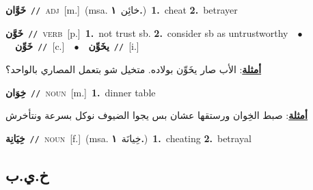 \documentclass[10pt,a4paper,twoside]{article} %
\begin{document}
\begin{multicols}{2}
{\setlength\topsep{0pt}\textbf{\foreignlanguage{arabic}{خَوَّان}}\ {\color{gray}\texttt{//}\color{black}}\ \textsc{adj}\ [m.]\ \color{gray}(msa. \foreignlanguage{arabic}{خائِن}~\foreignlanguage{arabic}{\textbf{١.}})\color{black}\ \textbf{1.}~cheat  \textbf{2.}~betrayer\ } \vspace{2mm}

{\setlength\topsep{0pt}\textbf{\foreignlanguage{arabic}{خَوَّن}}\ {\color{gray}\texttt{//}\color{black}}\ \textsc{verb}\ [p.]\ \textbf{1.}~not trust sb.  \textbf{2.}~consider sb as untrustworthy\ \ $\bullet$\ \ \setlength\topsep{0pt}\textbf{\foreignlanguage{arabic}{خَوِّن}}\ {\color{gray}\texttt{//}\color{black}}\ [c.]\ \ $\bullet$\ \ \setlength\topsep{0pt}\textbf{\foreignlanguage{arabic}{يخَوِّن}}\ {\color{gray}\texttt{//}\color{black}}\ [i.]\  \begin{flushright}\color{gray}\foreignlanguage{arabic}{\textbf{\underline{\foreignlanguage{arabic}{أمثلة}}}: الأب صار يخَوِّن بولاده. متخيل شو بتعمل المصاري بالواحد؟}\end{flushright}\color{black}} \vspace{2mm}

{\setlength\topsep{0pt}\textbf{\foreignlanguage{arabic}{خِوَان}}\ {\color{gray}\texttt{//}\color{black}}\ \textsc{noun}\ [m.]\ \textbf{1.}~dinner table\  \begin{flushright}\color{gray}\foreignlanguage{arabic}{\textbf{\underline{\foreignlanguage{arabic}{أمثلة}}}: صبط الخِوان ورستقها عشان بس يجوا الضيوف نوكل بسرعة ونتأخرش}\end{flushright}\color{black}} \vspace{2mm}

{\setlength\topsep{0pt}\textbf{\foreignlanguage{arabic}{خِيَانِة}}\ {\color{gray}\texttt{//}\color{black}}\ \textsc{noun}\ [f.]\ \color{gray}(msa. \foreignlanguage{arabic}{خِيانَة}~\foreignlanguage{arabic}{\textbf{١.}})\color{black}\ \textbf{1.}~cheating  \textbf{2.}~betrayal\ } \vspace{2mm}

\vspace{-3mm}
\subsection*{\color{blue}\foreignlanguage{arabic}{خ.ي.ب}\color{blue}{}} 


\end{multicols}
\end{document}
